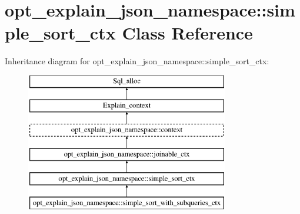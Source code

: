\hypertarget{classopt__explain__json__namespace_1_1simple__sort__ctx}{}\section{opt\+\_\+explain\+\_\+json\+\_\+namespace\+:\+:simple\+\_\+sort\+\_\+ctx Class Reference}
\label{classopt__explain__json__namespace_1_1simple__sort__ctx}
Inheritance diagram for opt\+\_\+explain\+\_\+json\+\_\+namespace\+:\+:simple\+\_\+sort\+\_\+ctx\+:\begin{figure}[H]
\begin{center}
\leavevmode
\includegraphics[height=6.000000cm]{classopt__explain__json__namespace_1_1simple__sort__ctx}
\end{center}
\end{figure}
